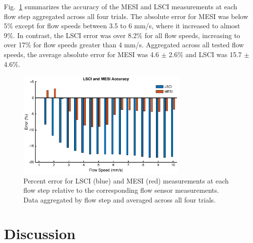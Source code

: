 \documentclass[12pt]{spieman}
\begin{document}
\begin{spacing}{2}
Fig.~\ref{fig:error} summarizes the accuracy of the MESI and LSCI measurements at each flow step aggregated across all four trials. The absolute error for MESI was below 5\% except for flow speeds between 3.5 to 6 mm/s, where it increased to almost 9\%. In contrast, the LSCI error was over 8.2\% for all flow speeds, increasing to over 17\% for flow speeds greater than 4 mm/s. Aggregated across all tested flow speeds, the average absolute error for MESI was 4.6 $\pm$ 2.6\% and LSCI was 15.7 $\pm$ 4.6\%.

\begin{figure}
    \centering
    \includegraphics[width=0.75\textwidth]{Figure7.pdf}
    \caption {
        Percent error for LSCI (blue) and MESI (red) measurements at each flow step relative to the corresponding flow sensor measurements. Data aggregated by flow step and averaged across all four trials.
    }
    \label{fig:error}
\end{figure}


\section{Discussion}
\label{sect:discussion}


\end{spacing}
\end{document}
